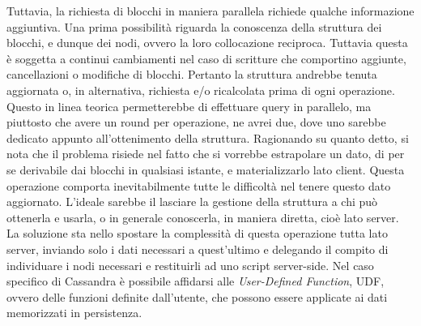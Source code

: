 		Tuttavia, la richiesta di blocchi in maniera parallela richiede qualche informazione aggiuntiva. Una prima possibilità riguarda la conoscenza della struttura dei blocchi, e dunque dei nodi, ovvero la loro collocazione reciproca. Tuttavia questa è soggetta a continui cambiamenti nel caso di scritture che comportino aggiunte, cancellazioni o modifiche di blocchi. Pertanto la struttura andrebbe tenuta aggiornata o, in alternativa, richiesta e/o ricalcolata prima di ogni operazione. Questo in linea teorica permetterebbe di effettuare query in parallelo, ma piuttosto che avere un round per operazione, ne avrei due, dove uno sarebbe dedicato appunto all'ottenimento della struttura.
		Ragionando su quanto detto, si nota che il problema risiede nel fatto che si vorrebbe estrapolare un dato, di per se derivabile dai blocchi in qualsiasi istante, e materializzarlo lato client. Questa operazione comporta inevitabilmente tutte le difficoltà nel tenere questo dato aggiornato. L'ideale sarebbe il lasciare la gestione della struttura a chi può ottenerla e usarla, o in generale conoscerla, in maniera diretta, cioè lato server.
		La soluzione sta nello spostare la complessità di questa operazione tutta lato server, inviando solo i dati necessari a quest'ultimo e delegando il compito di individuare i nodi necessari e restituirli ad uno script server-side. Nel caso specifico di Cassandra è possibile affidarsi alle \textit{User-Defined Function}, UDF, ovvero delle funzioni definite dall'utente, che possono essere applicate ai dati memorizzati in persistenza.
		
